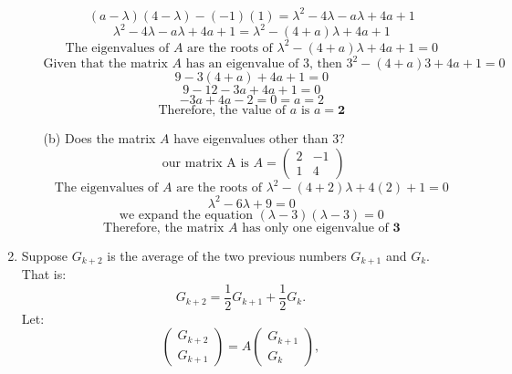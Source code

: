 \documentclass[a3paper,12pt]{extarticle} %
\begin{document}
\begin{enumerate}
\begin{enumerate}
\[        \]
        \[
            (a - \lambda)(4 - \lambda) - (-1)(1) = \lambda^2 - 4\lambda - a\lambda + 4a + 1 
        \]
        \[
            \lambda^2 - 4\lambda - a\lambda + 4a + 1 = \lambda^2 - (4 + a)\lambda + 4a + 1
        \]
        \[
            \text{The eigenvalues of } A \text{ are the roots of } \lambda^2 - (4 + a)\lambda + 4a + 1 = 0
        \]
        \[
            \text{Given that the matrix } A \text{ has an eigenvalue of 3, then } 3^2 - (4 + a)3 + 4a + 1 = 0
        \]
        \[
            9 - 3(4 + a) + 4a + 1 = 0
        \]
        \[
            9 - 12 - 3a + 4a + 1 = 0
        \]
        \[
            -3a + 4a - 2 = 0 = a = 2
        \]
        \[
            \text{Therefore, the value of } a \text{ is } a = \textbf{2}
        \]
        \item[(b)] Does the matrix \(A\) have eigenvalues other than 3?
        \[
            \text{ our matrix A is } A = \begin{pmatrix} 2 & -1 \\ 1 & 4 \end{pmatrix} 
        \]
        \[
            \text{The eigenvalues of } A \text{ are the roots of } \lambda^2 - (4 + 2)\lambda + 4(2) + 1 = 0
        \]
        \[
            \lambda^2 - 6\lambda + 9 = 0
        \]
        \[
            \text{we expand the equation } (\lambda - 3)(\lambda - 3) = 0
        \]
        \[
            \text{Therefore, the matrix } A \text{ has only one eigenvalue of } \textbf{3}
        \]
    \end{enumerate}
    \item Suppose \( G_{k+2} \) is the average of the two previous numbers \( G_{k+1} \) and \( G_k \). That is:
    \[
    G_{k+2} = \frac{1}{2} G_{k+1} + \frac{1}{2} G_k.
    \]
    Let:
    \[
    \begin{pmatrix} G_{k+2} \\ G_{k+1} \end{pmatrix} = A \begin{pmatrix} G_{k+1} \\ G_k \end{pmatrix},
    \]
    

\end{enumerate}
\end{document}
